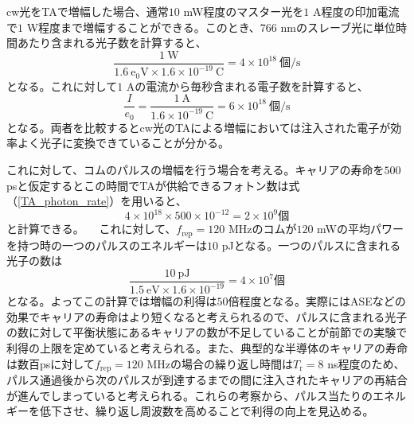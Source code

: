 \documentclass[uplatex, dvipdfmx, a4paper, report, papersize, 11pt]{jsbook}
\begin{document}
cw光をTAで増幅した場合、通常$10$ mW程度のマスター光を$1$ A程度の印加電流で$1$ W程度まで増幅することができる。このとき、$766$ nmのスレーブ光に単位時間あたり含まれる光子数を計算すると、
\begin{equation}\label{TA_photon_rate}
  \frac{1\ \mathrm{W}}{1.6\ \mathrm{e_0V}\times1.6\times10^{-19}\ \mathrm{C}} = 4\times10^{18}\ 個\mathrm{/s}
\end{equation}
となる。これに対して$1$ Aの電流から毎秒含まれる電子数を計算すると、
\begin{equation}
  \frac{I}{e_0} = \frac{1\ \mathrm{A}}{1.6\times10^{-19}\ \mathrm{C}} = 6\times10^{18}\ 個\mathrm{/s}
\end{equation}
となる。両者を比較するとcw光のTAによる増幅においては注入された電子が効率よく光子に変換できていることが分かる。\par
これに対して、コムのパルスの増幅を行う場合を考える。キャリアの寿命を$500$ psと仮定するとこの時間でTAが供給できるフォトン数は式（\ref{TA_photon_rate}）を用いると、
\begin{equation}
  4\times10^{18}\times500\times10^{-12} = 2\times10^9 個
\end{equation}
と計算できる。
　これに対して、$f_{\mathrm{rep}} = 120$ MHzのコムが$120$ mWの平均パワーを持つ時の一つのパルスのエネルギーは$10$ pJとなる。一つのパルスに含まれる光子の数は
\begin{equation}
  \frac{10\ \mathrm{pJ}}{1.5\ \mathrm{eV}\times1.6\times10^{-19}} = 4\times10^7 個
\end{equation}
となる。よってこの計算では増幅の利得は$50$倍程度となる。実際にはASEなどの効果でキャリアの寿命はより短くなると考えられるので、パルスに含まれる光子の数に対して平衡状態にあるキャリアの数が不足していることが前節での実験で利得の上限を定めていると考えられる。また、典型的な半導体のキャリアの寿命は数百psに対して$f_{\mathrm{rep}} = 120$ MHzの場合の繰り返し時間は$T_\mathrm{r} = 8$ ns程度のため、パルス通過後から次のパルスが到達するまでの間に注入されたキャリアの再結合が進んでしまっていると考えられる。これらの考察から、パルス当たりのエネルギーを低下させ、繰り返し周波数を高めることで利得の向上を見込める。
\end{document}
